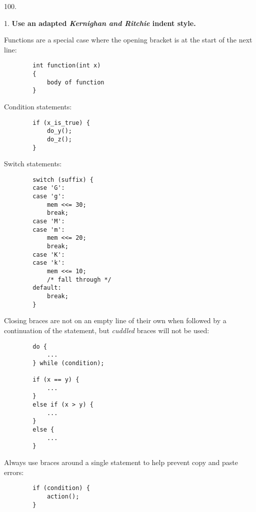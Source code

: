 \begin{labeling}{100.}
\item [1.] \textbf{Use an adapted \textit{Kernighan and Ritchie} indent style.}
  
   \hspace{1cm} Functions are a special case where the opening bracket is at the start of the next line:
   \begin{verbatim}
        int function(int x)
        {
            body of function
        }
   \end{verbatim}
   \hspace{1cm} \textnormal{Condition statements:}
   \begin{verbatim}
        if (x_is_true) {
            do_y();
            do_z();
        }
   \end{verbatim}
   \hspace{1cm} \textnormal{Switch statements:}
   \begin{verbatim}
        switch (suffix) {
        case 'G':
        case 'g':
            mem <<= 30;
            break;
        case 'M':
        case 'm':
            mem <<= 20;
            break;
        case 'K':
        case 'k':
            mem <<= 10;
            /* fall through */
        default:
            break;
        }
   \end{verbatim}
   \hspace{1cm} Closing braces are not on an empty line of their own when followed by a continuation of the statement, but \textit{cuddled} braces will not be used:
   \begin{verbatim}
        do {
            ...
        } while (condition);

        if (x == y) {
            ...
        }
        else if (x > y) {
            ...
        }
        else {
            ...
        }
   \end{verbatim}
   \hspace{1cm} Always use braces around a single statement to help prevent copy and paste errors:
   \begin{verbatim}
        if (condition) {
            action();
        }
    

\end{verbatim}
\end{labeling}
